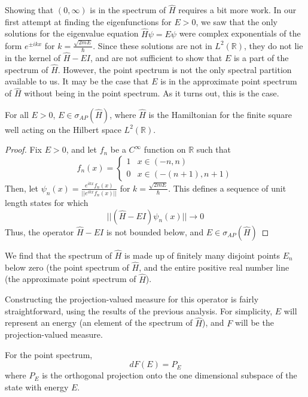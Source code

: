 Showing that $(0,\infty)$ is in the spectrum of $\hat{H}$ requires a bit more
work. In our first attempt at finding the eigenfunctions for $E>0$, we saw that
the only solutions for the eigenvalue equation $\hat{H}\psi = E\psi$ were
complex exponentials of the form $e^{\pm ikx}$ for
$k=\frac{\sqrt{2mE}}{\hbar}$. Since these solutions are not in
$L^2(\mathbb{R})$, they do not lie in the kernel of $\hat{H}-EI$, and are not
sufficient to show that $E$ is a part of the spectrum of $\hat{H}$. However, the
point spectrum is not the only spectral partition available to us. It may be the
case that $E$ is in the approximate point spectrum of $\hat{H}$ without being in
the point spectrum. As it turns out, this is the case.

\begin{theorem}
    For all $E>0$, $E\in\sigma_{AP}(\hat{H})$, where $\hat{H}$ is the
    Hamiltonian for the finite square well acting on the Hilbert space
    $L^2(\mathbb{R})$.
\end{theorem}

\begin{proof}
    Fix $E>0$, and let $f_n$ be a $C^{\infty}$ function on $\mathbb{R}$ such
    that
    \[
        f_n(x) =
        \begin{cases}
            1 & x\in(-n,n)\\
            0 & x\in(-(n+1),n+1)
        \end{cases}
        \]
    Then, let $\psi_n(x) = \frac{e^{ikx}f_n(x)}{||e^{ikx}f_n(x)||}$ for
    $k=\frac{\sqrt{2mE}}{\hbar}$. This defines a sequence of unit length states
    for which 
    \[
        ||(\hat{H}-EI)\psi_n(x)||\to 0
        \]
    Thus, the operator $\hat{H}-EI$ is not bounded below, and
    $E\in\sigma_{AP}(\hat{H})$
\end{proof}

We find that the spectrum of $\hat{H}$ is made up of finitely many disjoint
points $E_n$ below zero (the point spectrum of $\hat{H}$, and the entire
positive real number line (the approximate point spectrum of $\hat{H}$).

Constructing the projection-valued measure for this operator is fairly
straightforward, using the results of the previous analysis. For simplicity,
$E$ will represent an energy (an element of the spectrum of $\hat{H}$), and $F$
will be the projection-valued measure.

For the point spectrum, 
\[
    dF(E) = P_E
\]
where $P_E$ is the orthogonal
projection onto the one dimensional subspace of the state with energy $E$.

